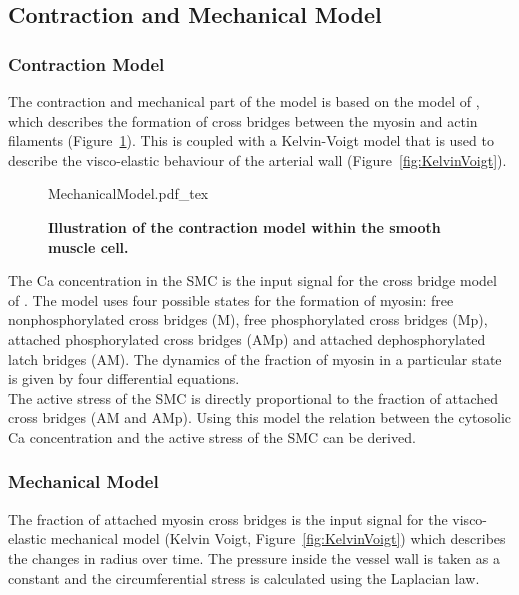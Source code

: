 
\subsection{Contraction and Mechanical Model}

\subsubsection{Contraction Model}
The contraction and mechanical part of the model is based on the model of \citet{Hai1989}, which describes the formation of cross bridges between the myosin and actin filaments (Figure~\ref{fig:MechModell}). This is coupled with a Kelvin-Voigt model that is used to describe the visco-elastic behaviour of the arterial wall (Figure~\ref{fig:KelvinVoigt}).\\
\begin{figure}[h!]
  \centering
  \def\svgwidth{450pt} %
  \footnotesize
  {MechanicalModel.pdf_tex}
  \caption{\textbf{Illustration of the contraction model within the smooth muscle cell. }}
\label{fig:MechModell}
\end{figure}

The \gls{Ca} concentration in the SMC is the input signal for the cross bridge model of \citet{Hai1989}. The model uses four possible states for the formation of myosin: free nonphosphorylated cross bridges (M), free phosphorylated cross bridges (Mp), attached phosphorylated cross bridges (AMp) and attached dephosphorylated latch bridges (AM). The dynamics of the fraction of myosin in a particular state is given by four differential equations.\\

The active stress of the SMC is directly proportional to the fraction of attached cross bridges (AM and AMp). Using this model the relation between the cytosolic \gls{Ca} concentration and the active stress of the SMC can be derived.\\

\subsubsection{Mechanical Model}
The fraction of attached myosin cross bridges is the input signal for the visco-elastic mechanical model (Kelvin Voigt, Figure~\ref{fig:KelvinVoigt})  which describes the changes in radius over time. The pressure inside the vessel wall is taken as a constant and the circumferential stress is calculated using the Laplacian law. 



